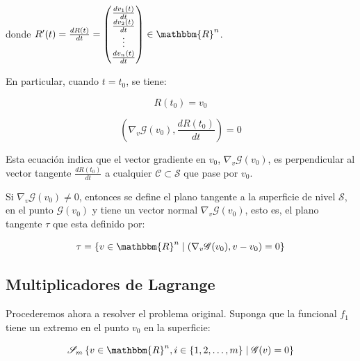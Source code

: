                 donde $R'(t) = \frac{dR(t)}{dt} = \begin{pmatrix} \frac{d v_1(t)}{dt} \\ \frac{d v_2(t)}{dt} \\ \vdots \\ \frac{d v_n(t)}{dt} \end{pmatrix} \in \mathbbm{R}^n$.

                En particular, cuando $t = t_0$, se tiene:

                \begin{equation*}
                    R(t_0) = v_0
                \end{equation*}

                \begin{equation*}
                    \left( \nabla_v \mathscr{G}(v_0), \frac{dR(t_0)}{dt} \right) = 0
                \end{equation*}

                Esta ecuación indica que el vector gradiente en $v_0$, $\nabla_v \mathscr{G}(v_0)$,  es perpendicular al vector tangente $\frac{dR(t_0)}{dt}$ a cualquier $\mathscr{C} \subset \mathscr{S}$ que pase por $v_0$.



                Si $\nabla_v \mathscr{G}(v_0) \ne 0$, entonces se define el plano tangente a la superficie de nivel $\mathscr{S}$, en el punto $\mathscr{G}(v_0)$ y tiene un vector normal $\nabla_v \mathscr{G}(v_0)$, esto es, el plano tangente $\tau$ que esta definido por:

                \begin{equation}
                    \tau = \left\{ v \in \mathbbm{R}^n \mid \left( \nabla_v \mathscr{G}(v_0), v - v_0 \right) = 0 \right\}
                \end{equation}

        \subsection{Multiplicadores de Lagrange}

            Procederemos ahora a resolver el problema original. Suponga que la funcional $f_1$ tiene un extremo en el punto $v_0$ en la superficie:

            \begin{equation}
                \mathscr{S}_m \left\{ v \in \mathbbm{R}^n, i \in \left\{ 1, 2, \dots, m \right\} \mid \mathscr{G}(v) = 0 \right\}
            \end{equation}

